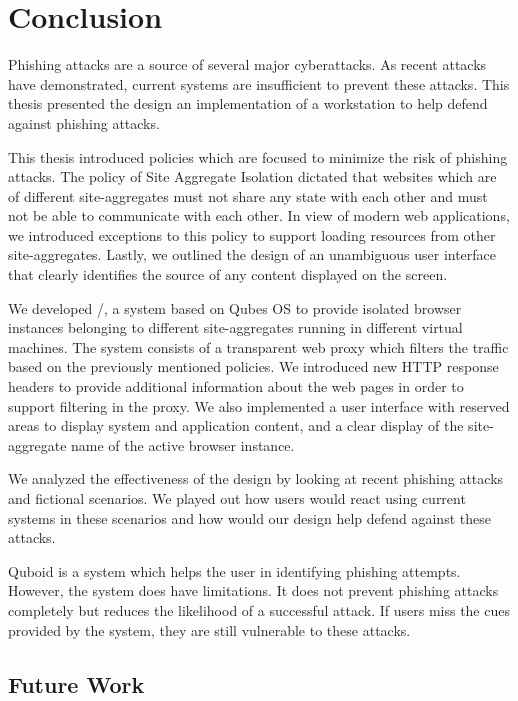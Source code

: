 \chapter{Conclusion} \label{chap:conclusion}

Phishing attacks are a source of several major cyberattacks. As recent attacks have demonstrated, current systems are insufficient to prevent these attacks. This thesis presented the design an implementation of a workstation to help defend against phishing attacks.

This thesis introduced policies which are focused to minimize the risk of phishing attacks. The policy of Site Aggregate Isolation dictated that websites which are of different site-aggregates must not share any state with each other and must not be able to communicate with each other. In view of modern web applications, we introduced exceptions to this policy to support loading resources from other site-aggregates. Lastly, we outlined the design of an unambiguous user interface that clearly identifies the source of any content displayed on the screen.

We developed \namesecureworkstation/, a system based on Qubes OS to provide isolated browser instances belonging to different site-aggregates running in different virtual machines. The system consists of a transparent web proxy which filters the traffic based on the previously mentioned policies. We introduced new HTTP response headers to provide additional information about the web pages in order to support filtering in the proxy. We also implemented a user interface with reserved areas to display system and application content, and a clear display of the site-aggregate name of the active browser instance.

We analyzed the effectiveness of the design by looking at recent phishing attacks and fictional scenarios. We played out how users would react using current systems in these scenarios and how would our design help defend against these attacks.

Quboid is a system which helps the user in identifying phishing attempts. However, the system does have limitations. It does not prevent phishing attacks completely but reduces the likelihood of a successful attack. If users miss the cues provided by the system, they are still vulnerable to these attacks.

\section{Future Work}

